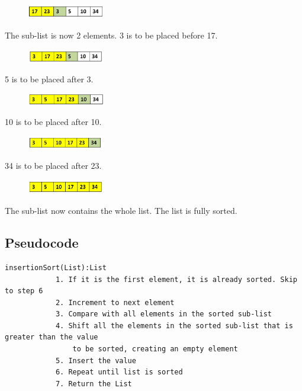 \begin{figure}[H]
\centering
\includegraphics[width=0.3\textwidth]{pictures/insert2.png}
\label{fig:insert2}
\end{figure}

The sub-list is now 2 elements. 3 is to be placed before 17.

\begin{figure}[H]
\centering
\includegraphics[width=0.3\textwidth]{pictures/insert3.png}
\label{fig:insert3}
\end{figure}

5 is to be placed after 3.

\begin{figure}[H]
\centering
\includegraphics[width=0.3\textwidth]{pictures/insert4.png}
\label{fig:insert4}
\end{figure}

10 is to be placed after 10.

\begin{figure}[H]
\centering
\includegraphics[width=0.3\textwidth]{pictures/insert5.png}
\label{fig:insert5}
\end{figure}

34 is to be placed after 23.

\begin{figure}[H]
\centering
\includegraphics[width=0.3\textwidth]{pictures/insert6.png}
\label{fig:insert6}
\end{figure}

The sub-list now contains the whole list. The list is fully sorted.

\subsection{Pseudocode}

\begin{verbatim}
insertionSort(List):List
            1. If it is the first element, it is already sorted. Skip to step 6
            2. Increment to next element
            3. Compare with all elements in the sorted sub-list
            4. Shift all the elements in the sorted sub-list that is greater than the value 
                to be sorted, creating an empty element
            5. Insert the value
            6. Repeat until list is sorted
            7. Return the List
\end{verbatim}

